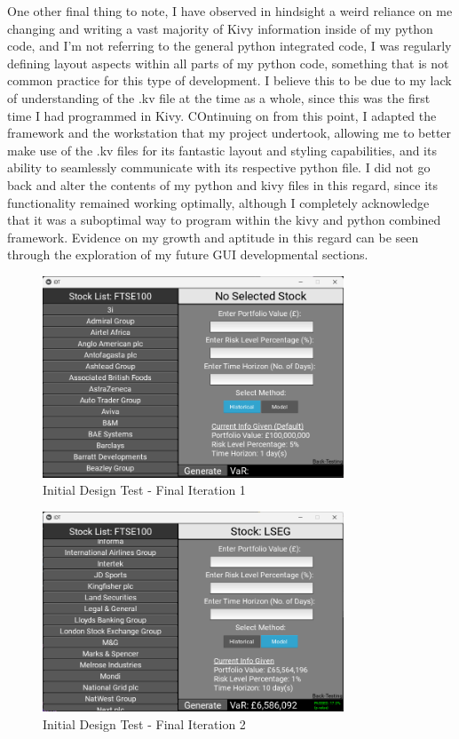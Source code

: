 \documentclass{article}
\begin{document}
One other final thing to note, I have observed in hindsight a weird reliance on me changing and writing a vast majority of Kivy information inside of my python code, and I'm not referring to the general python integrated code, I was regularly defining layout aspects within all parts of my python code, something that is not common practice for this type of development. I believe this to be due to my lack of understanding of the .kv file at the time as a whole, since this was the first time I had programmed in Kivy. COntinuing on from this point, I adapted the framework and the workstation that my project undertook, allowing me to better make use of the .kv files for its fantastic layout and styling capabilities, and its ability to seamlessly communicate with its respective python file. I did not go back and alter the contents of my python and kivy files in this regard, since its functionality remained working optimally, although I completely acknowledge that it was a suboptimal way to program within the kivy and python combined framework. Evidence on my growth and aptitude in this regard can be seen through the exploration of my future GUI developmental sections.\\\vspace{0.3cm}
\begin{figure}[H]
  \centering
  \includegraphics[width=0.8\textwidth]{Images/Initial Design Tes - Final Iteration 1.png}
  \caption{Initial Design Test - Final Iteration 1}
  \label{fig:Initial Design Test - Final Iteration 1}
\end{figure}

\begin{figure}[H]
  \centering
  \includegraphics[width=0.8\textwidth]{Images/Initial Design Tes - Final Iteration 2.png}
  \caption{Initial Design Test - Final Iteration 2}
  \label{fig:Initial Design Test - Final Iteration 2}
\end{figure}
\end{document}
